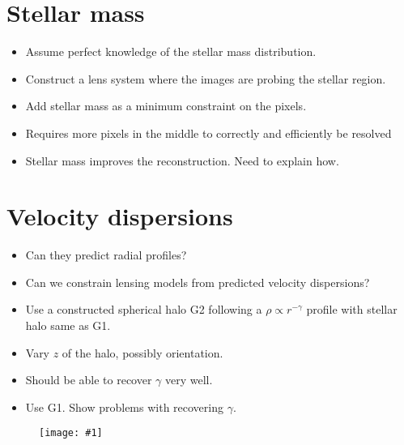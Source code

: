\documentclass[onecolumn,galley]{mn2e}
\newcommand\plotone[1]{%
 \centering
 \leavevmode
 \texttt{[image: \#1]}%
}%
\begin{document}
\section{Stellar mass}
\begin{itemize}
\item Assume perfect knowledge of the stellar mass distribution.
\item Construct a lens system where the images are probing the stellar region.
\item Add stellar mass as a minimum constraint on the pixels.
\item Requires more pixels in the middle to correctly and efficiently be resolved
\item Stellar mass improves the reconstruction. Need to explain how.
\end{itemize}



\section{Velocity dispersions}
\begin{itemize}
\item Can they predict radial profiles?
\item Can we constrain lensing models from predicted velocity dispersions?
\item Use a constructed spherical halo G2 following a $\rho \propto r^{-\gamma}$ profile with stellar halo same as G1.
\item Vary $z$ of the halo, possibly orientation.
\item Should be able to recover $\gamma$ very well.
\item Use G1. Show problems with recovering $\gamma$.
\end{itemize}

\begin{figure}
\plotone{sigma_beta.pdf}
\caption{}
\end{figure}


\end{document}
